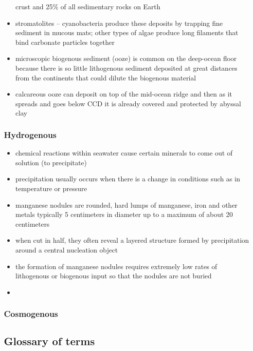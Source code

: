 \begin{itemize}
		crust and 25\% of all sedimentary rocks on Earth
	\item stromatolites -- cyanobacteria produce these deposits by trapping
		fine sediment in mucous mats; other types of algae produce long
		filaments that bind carbonate particles together
	\item microscopic biogenous sediment (ooze) is common on the
		deep-ocean floor because there is so little lithogenous
		sediment deposited at great distances from the continents that
		could dilute the biogenous material
	\item calcareous ooze can deposit on top of the mid-ocean ridge and
		then as it spreads and goes below CCD it is already covered
		and protected by abyssal clay
\end{itemize}

\subsubsection{Hydrogenous}
\begin{itemize}
	\item chemical reactions within seawater cause certain minerals to
		come out of solution (to precipitate)
	\item precipitation usually occurs when there is a change in conditions
		such as in temperature or pressure
	\item manganese nodules are rounded, hard lumps of manganese, iron and
		other metals typically 5 centimeters in diameter up to a
		maximum of about 20 centimeters
	\item when cut in half, they often reveal a layered structure formed
		by precipitation around a central nucleation object
	\item the formation of manganese nodules requires extremely low
		rates of lithogenous or biogenous input so that the nodules
		are not buried
	\item 
\end{itemize}

\subsubsection{Cosmogenous}

\subsection{Glossary of terms}

